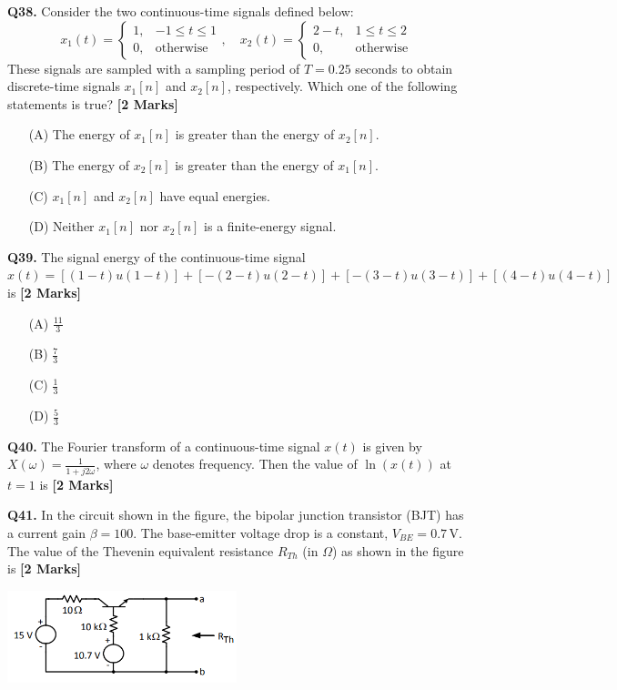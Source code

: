 \documentclass[11pt]{article}
\newcommand{\questionb}[2]{
    \noindent\textbf{Q#2.} #1 \hfill \textbf{[2 Marks]}
}
\begin{document}
\questionb{Consider the two continuous-time signals defined below:
\[
x_1(t) = \begin{cases}
1, & -1 \leq t \leq 1 \\
0, & \text{otherwise}
\end{cases}, \quad
x_2(t) = \begin{cases}
2 - t, & 1 \leq t \leq 2 \\
0, & \text{otherwise}
\end{cases}
\]
These signals are sampled with a sampling period of \( T = 0.25 \) seconds to obtain discrete-time signals \( x_1[n] \) and \( x_2[n] \), respectively. Which one of the following statements is true?}{38}
\begin{enumerate}
    \item[(A)] The energy of \( x_1[n] \) is greater than the energy of \( x_2[n] \).
    \item[(B)] The energy of \( x_2[n] \) is greater than the energy of \( x_1[n] \).
    \item[(C)] \( x_1[n] \) and \( x_2[n] \) have equal energies.
    \item[(D)] Neither \( x_1[n] \) nor \( x_2[n] \) is a finite-energy signal.
\end{enumerate}
\vspace{0.5cm}

\questionb{The signal energy of the continuous-time signal \( x(t) = [(1 - t)u(1 - t)] + [-(2 - t)u(2 - t)] + [-(3 - t)u(3 - t)] + [(4 - t)u(4 - t)] \) is}{39}
\begin{enumerate}
    \item[(A)] \( \frac{11}{3} \)
    \item[(B)] \( \frac{7}{3} \)
    \item[(C)] \( \frac{1}{3} \)
    \item[(D)] \( \frac{5}{3} \)
\end{enumerate}
\vspace{0.5cm}

\questionb{The Fourier transform of a continuous-time signal \( x(t) \) is given by \( X(\omega) = \frac{1}{1 + j2\omega} \), where \( \omega \) denotes frequency. Then the value of \( \ln(x(t)) \) at \( t = 1 \) is}{40}
\vspace{0.5cm}

\questionb{In the circuit shown in the figure, the bipolar junction transistor (BJT) has a current gain \( \beta = 100 \). The base-emitter voltage drop is a constant, \( V_{BE} = 0.7 \, \text{V} \). The value of the Thevenin equivalent resistance \( R_{Th} \) (in \( \Omega \)) as shown in the figure is}{41}
\begin{center}
\includegraphics[width=0.5\textwidth]{figures/41.png}
\end{center}
\vspace{0.5cm}
\end{document}
